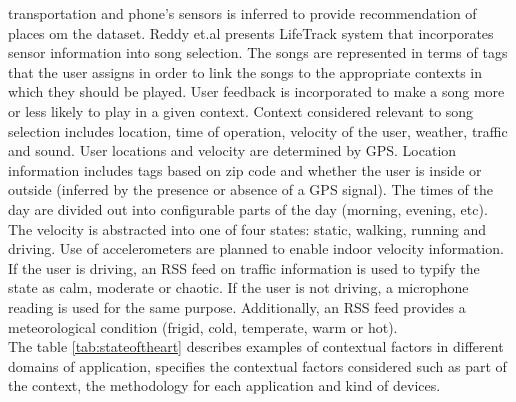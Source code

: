 transportation and phone's sensors is inferred to provide
recommendation of places  om the dataset.
Reddy et.al\cite{reddy2006lifetrak} presents LifeTrack system that
incorporates sensor information into song selection. The songs are
represented in terms of tags that the user assigns in order to link
the songs to the appropriate contexts in which they should be played.
User feedback is incorporated to make a song more or less likely to
play in a given context. Context considered relevant to song selection
includes location, time of operation, velocity of the user, weather,
traffic and sound. User locations and velocity are determined by GPS.
Location information includes tags based on zip code and whether the
user is inside or outside (inferred by the presence or absence of a
GPS signal). The times of the day are divided out into configurable
parts of the day (morning, evening, etc). The velocity is abstracted
into one of four states: static, walking, running and driving. Use of
accelerometers are planned to enable indoor velocity information. If
the user is driving, an RSS feed on traffic information is used to
typify the state as calm, moderate or chaotic. If the user is not
driving, a microphone reading is used for the same purpose.
Additionally, an RSS feed provides a meteorological condition (frigid,
cold, temperate, warm or hot).\\ The table \ref{tab:stateoftheart}  
describes examples of contextual factors in different domains 
of application, specifies the contextual factors considered 
such as  part of the context, the methodology for each 
application and  kind of devices.

